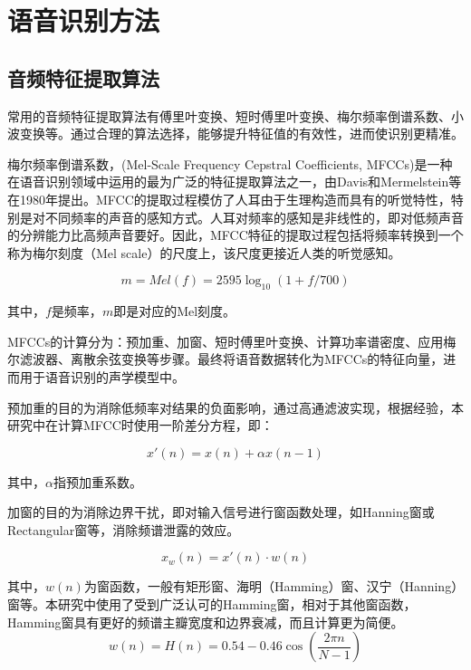 \documentclass[lang=cn,cite=super]{elegantpaper}
\begin{document}
\section{语音识别方法}
\subsection{音频特征提取算法}
常用的音频特征提取算法有傅里叶变换、短时傅里叶变换、梅尔频率倒谱系数、小波变换\cite{grossmann1984decomposition}等。通过合理的算法选择，能够提升特征值的有效性，进而使识别更精准。

梅尔频率倒谱系数，(Mel-Scale Frequency Cepstral Coefficients, MFCCs)是一种在语音识别领域中运用的最为广泛的特征提取算法之一，由Davis和Mermelstein等\cite{Davis1980}在1980年提出。MFCC的提取过程模仿了人耳由于生理构造而具有的听觉特性，特别是对不同频率的声音的感知方式。人耳对频率的感知是非线性的，即对低频声音的分辨能力比高频声音要好。因此，MFCC特征的提取过程包括将频率转换到一个称为梅尔刻度（Mel scale）的尺度上，该尺度更接近人类的听觉感知。

\begin{equation}
    m = Mel(f) = 2595 \log_{10}(1+f/700)
\end{equation}

其中，$f$是频率，$m$即是对应的Mel刻度。

MFCCs的计算分为：预加重、加窗、短时傅里叶变换、计算功率谱密度、应用梅尔滤波器、离散余弦变换等步骤。最终将语音数据转化为MFCCs的特征向量，进而用于语音识别的声学模型中。

预加重的目的为消除低频率对结果的负面影响，通过高通滤波实现，根据经验，本研究中在计算MFCC时使用一阶差分方程，即：

\begin{equation}
    x'(n) = x(n) + \alpha x(n-1) 
\end{equation}

其中，$\alpha$指预加重系数。

加窗的目的为消除边界干扰，即对输入信号进行窗函数处理，如Hanning窗或Rectangular窗等，消除频谱泄露的效应。

\begin{equation}
    x_w(n) = x'(n) \cdot w(n)
\end{equation}

其中，$w(n)$为窗函数，一般有矩形窗、海明（Hamming）窗、汉宁（Hanning）窗等。本研究中使用了受到广泛认可的Hamming窗，相对于其他窗函数，Hamming窗具有更好的频谱主瓣宽度和边界衰减，而且计算更为简便。
\begin{equation}
    w(n) = H(n) = 0.54 - 0.46 \cos \left( \frac{2\pi n}{N-1} \right)
\end{equation}
\end{document}
